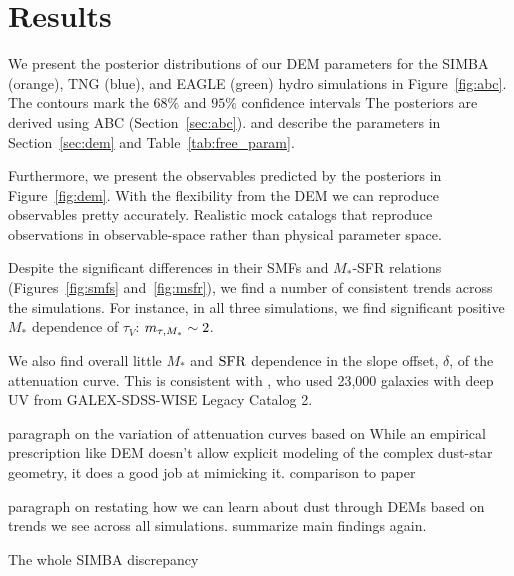 \section{Results} \label{sec:results}
We present the posterior distributions of our DEM parameters for the SIMBA
(orange), TNG (blue), and EAGLE (green) hydro simulations in
Figure~\ref{fig:abc}. The contours mark the $68\%$ and $95\%$ confidence intervals
The posteriors are derived using ABC (Section~\ref{sec:abc}).
and describe the parameters in Section~\ref{sec:dem} and Table~\ref{tab:free_param}. 

Furthermore, we present the observables predicted by the posteriors in
Figure~\ref{fig:dem}. 
 With the flexibility from the DEM we can reproduce observables pretty
accurately.  
Realistic mock catalogs that reproduce observations in observable-space rather
than physical parameter space.  

Despite the significant differences in their SMFs and $M_*$-SFR relations 
(Figures~\ref{fig:smfs} and~\ref{fig:msfr}), we find a number of consistent
trends across the simulations. For instance, in all three simulations, we 
find significant positive $M_*$ dependence of $\tau_V$: $m_{\tau,M_*} \sim 2$. 

We also find overall little $M_*$ and ${\rm SFR}$ dependence in the
slope offset, $\delta$, of the attenuation curve. 
This is consistent with \cite{salim2020}, who used 23,000 galaxies with deep UV from GALEX-SDSS-WISE Legacy Catalog 2. 

paragraph on the variation of attenuation curves based on 
While an empirical prescription like DEM doesn't allow explicit modeling of the
complex dust-star geometry, it does a good job at mimicking it. 
comparison to \cite{narayanan2018} paper 

paragraph on restating how we can learn about dust through DEMs based on trends we see
across all simulations. summarize main findings again. 

The whole SIMBA discrepancy

